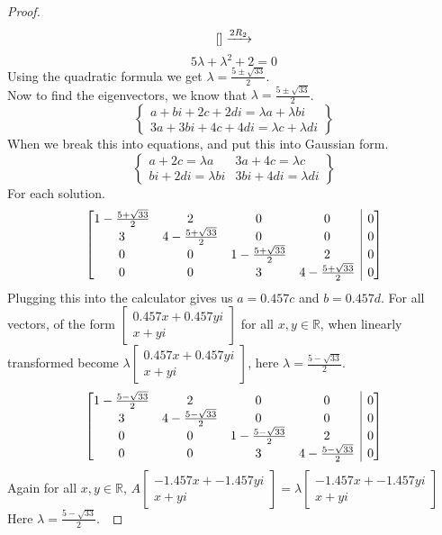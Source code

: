 \documentclass[12pt]{article}   %
\makeatletter
\newcommand{\R}{\mathbb{R}} %
\newenvironment{amatrix}[1]{%
  \left[\begin{array}{@{}*{#1}{c}|c@{}}
}{%
  \end{array}\right]
}
\makeatother
\begin{document}
\begin{proof}
\[\begin{amatrix}{2}
    \end{amatrix}\xrightarrow{2R_2}\]
    \[5\lambda + \lambda^2 + 2 = 0\]
    Using the quadratic formula we get $\lambda = \frac{5\pm\sqrt{33}}{2}$.\\
    Now to find the eigenvectors, we know that $\lambda = \frac{5\pm\sqrt{33}}{2}$.
    \[\left \{ \begin{array}{c}
    a + bi + 2c + 2di = \lambda a + \lambda bi \\
    3a + 3bi + 4c + 4di = \lambda c + \lambda di \end{array} \right \}\]
    When we break this into equations, and put this into Gaussian form.
     \[\left \{ \begin{array}{c|c}
    a  + 2c  = \lambda a  & 3a  + 4c = \lambda c\\
    bi + 2di = \lambda bi  & 
    3bi + 4di = \lambda di
    \end{array} \right\}\]
    For each solution.
    \[\begin{amatrix}{4}
    1 - \frac{5+\sqrt{33}}{2} & 2 & 0 & 0 & 0\\
    3 &4-\frac{5+\sqrt{33}}{2} & 0 & 0 & 0\\0 & 0 & 1-\frac{5+\sqrt{33}}{2}& 2 & 0\\ 0 & 0 & 3 & 4-\frac{5+\sqrt{33}}{2} & 0\\
    \end{amatrix}\]
    Plugging this into the calculator gives us $a=0.457c$ and $b=0.457d$. For all vectors, of the form $\begin{bmatrix}
    0.457x +0.457yi\\x +yi
    \end{bmatrix}$ for all $x,y\in\R$, when linearly transformed become $\lambda\begin{bmatrix}
    0.457x +0.457yi\\x +yi
    \end{bmatrix}$, here $\lambda = \frac{5-\sqrt{33}}{2}$.
    \[\begin{amatrix}{4}
    1 - \frac{5-\sqrt{33}}{2} & 2 & 0 & 0 & 0\\
    3 &4-\frac{5-\sqrt{33}}{2} & 0 & 0 & 0\\0 & 0 & 1-\frac{5-\sqrt{33}}{2}& 2 & 0\\ 0 & 0 & 3 & 4-\frac{5-\sqrt{33}}{2} & 0\\
    \end{amatrix}\]
    Again for all $x,y\in\R$, $A\begin{bmatrix}
    -1.457x + -1.457yi\\x+yi
    \end{bmatrix}=\lambda\begin{bmatrix}
    -1.457x + -1.457yi\\x+yi
    \end{bmatrix}$ Here $\lambda = \frac{5-\sqrt{33}}{2}$.\ 
\end{proof}
\end{document}

